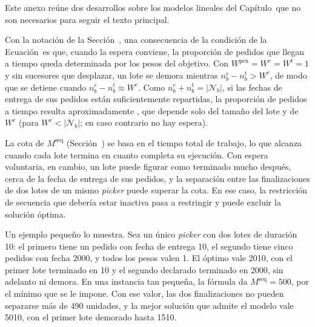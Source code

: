 \startchapter[title={Detalles de los modelos lineales}, reference=Anexo_Modelos]

Este anexo reúne dos desarrollos sobre los modelos lineales del
Capítulo~\in[Capitulo_3] que no son necesarios para seguir el texto
principal.

\startsection[title={Nivel de servicio con espera voluntaria}, reference=sec:anexo_sla]

Con la notación de la Sección~, una consecuencia
de la condición de la Ecuación~ es que, cuando la
espera conviene, la proporción de pedidos que llegan a tiempo queda
determinada por los pesos del objetivo. Con $W^{\text{pen}} = W^{e} = W^{t} = 1$ y sin sucesores que
desplazar, un lote se demora mientras $n^{e}_b - n^{t}_b > W^{c}$, de modo
que se detiene cuando $n^{e}_b - n^{t}_b \approx W^{c}$. Como
$n^{e}_b + n^{t}_b = |\mathcal{N}_b|$, si las fechas de entrega de sus pedidos
están suficientemente repartidas, la proporción de pedidos a tiempo resulta
aproximadamente
\startformula
	,
\stopformula
que depende solo del tamaño del lote y de $W^{c}$ (para $W^{c} < |\mathcal{N}_b|$;
en caso contrario no hay espera).

\stopsection

\startsection[title={Validez de $M^{\text{seq}}$ con espera voluntaria}, reference=sec:anexo_mseq]

La cota de
$M^{\text{seq}}$ (Sección~) se basa en el tiempo total de
trabajo, lo que alcanza cuando cada lote termina en cuanto completa su
ejecución. Con espera voluntaria, en cambio, un lote puede figurar como
terminado mucho después, cerca de la fecha de entrega de sus pedidos, y la
separación entre las finalizaciones de dos lotes de un mismo {\em picker}
puede superar la cota. En ese caso, la restricción de secuencia que debería
estar inactiva pasa a restringir y puede excluir la solución óptima.

Un ejemplo pequeño lo muestra. Sea un único {\em picker} con dos lotes de
duración 10: el primero tiene un pedido con fecha de entrega 10, el segundo
tiene cinco pedidos con fecha 2000, y todos los pesos valen 1. El óptimo vale
2010, con el primer lote terminado en 10 y el segundo declarado terminado en
2000, sin adelanto ni demora. En una instancia tan pequeña, la fórmula da
$M^{\text{seq}} = 500$, por el mínimo que se le impone. Con ese valor, las dos
finalizaciones no pueden separarse más de 490 unidades, y la mejor solución que
admite el modelo vale 5010, con el primer lote demorado hasta 1510.

